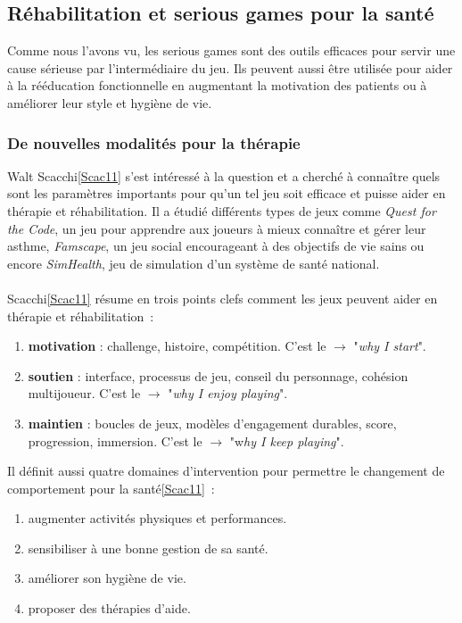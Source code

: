 \subsection{Réhabilitation et serious games pour la santé}
Comme nous l'avons vu, les serious games sont des outils efficaces pour servir une cause sérieuse par l'intermédiaire du jeu. Ils peuvent aussi être utilisée pour aider à la rééducation fonctionnelle en augmentant la motivation des patients ou à améliorer leur style et hygiène de vie.
		\subsubsection{De nouvelles modalités pour la thérapie}
Walt Scacchi\ref{Scac11} s'est intéressé à la question et a cherché à connaître quels sont les paramètres importants pour qu'un tel jeu soit efficace et puisse aider en thérapie et réhabilitation. Il a étudié différents types de jeux comme \emph{Quest for the Code}, un jeu pour apprendre aux joueurs à mieux connaître et gérer leur asthme, \emph{Famscape}, un jeu social encourageant à des objectifs de vie sains ou encore \emph{SimHealth}, jeu de simulation d'un système de santé national.

\paragraph{}
Scacchi\ref{Scac11} résume en trois points clefs comment les jeux peuvent aider en thérapie et réhabilitation~:
\begin{enumerate}
	\item \textbf{motivation }: challenge, histoire, compétition. C'est le $\rightarrow $ "\emph{why I start}".
	\item \textbf{soutien} : interface, processus de jeu, conseil du personnage, cohésion multijoueur. C'est le $\rightarrow $ "\emph{why I enjoy playing}".	
	\item \textbf{maintien} : boucles de jeux, modèles d'engagement durables, score, progression, immersion. C'est le $\rightarrow $ "w\emph{hy	I keep playing}".
\end{enumerate}

Il définit aussi quatre domaines d'intervention pour permettre le changement de comportement pour la santé\ref{Scac11}~:
\begin{enumerate}
	\item augmenter activités physiques et performances.
	\item sensibiliser à une bonne gestion de sa santé.
	\item améliorer son hygiène de vie.
	\item proposer des thérapies d'aide.
\end{enumerate}
		

